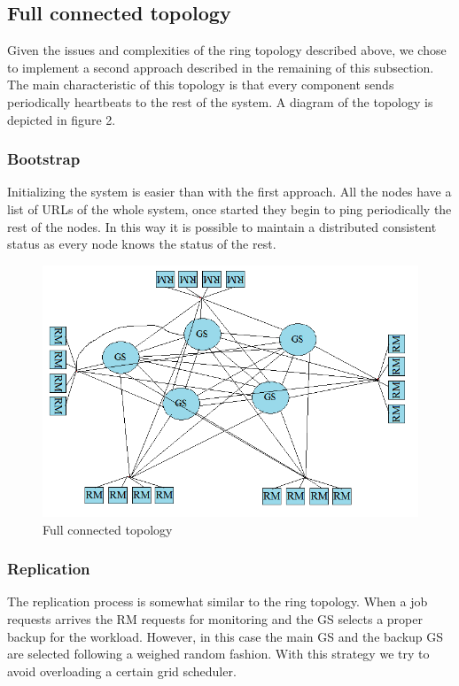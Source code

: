 \subsection{Full connected topology}
Given the issues and complexities of the ring topology described above, we chose to implement a second approach described in the remaining of this subsection. The main characteristic of this topology is that every component sends periodically heartbeats to the rest of the system. A diagram of the topology is depicted in figure 2.

\subsubsection{Bootstrap}
Initializing the system is easier than with the first approach. All the nodes have a list of URLs of the whole system, once started they begin to ping periodically the rest of the nodes. In this way it is possible to maintain a distributed consistent status as every node knows the status of the rest.

\begin{figure}
\centering
	\includegraphics[scale=0.61]{full.png}
	\caption{Full connected topology}
\end{figure}

\subsubsection{Replication}

The replication process is somewhat similar to the ring topology. When a job requests arrives the RM requests for monitoring and the GS selects a proper backup for the workload. However, in this case the main GS and the backup GS are selected following a weighed random fashion. With this strategy we try to avoid overloading a certain grid scheduler.


